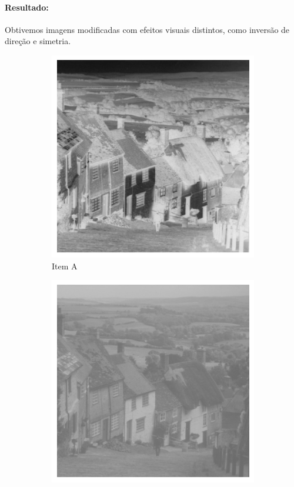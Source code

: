 \documentclass[12pt,a4paper]{report}
\begin{document}
\paragraph{Resultado:} 
Obtivemos imagens modificadas com efeitos visuais distintos, como inversão de direção e simetria.
\begin{figure}[H]
  \centering
  \begin{subfigure}{0.3\textwidth}
    \includegraphics[width=\linewidth]{imagens/ex8-a.png}
    \caption{Item A}
  \end{subfigure}
  \begin{subfigure}{0.3\textwidth}
    \includegraphics[width=\linewidth]{imagens/ex8-b.png}

\end{subfigure}
\end{figure}
\end{document}
